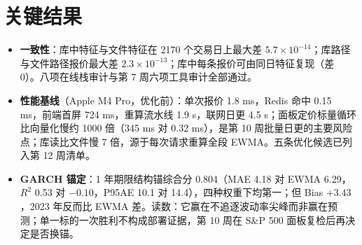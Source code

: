 \documentclass[11pt]{ctexart}
\begin{document}
\section{关键结果}
\begin{itemize}
  \item \textbf{一致性}：库中特征与文件特征在 2170 个交易日上最大差 $5.7\times10^{-14}$；库路径与文件路径报价最大差 $2.3\times10^{-13}$；库中每条报价可由同日特征复现（差 0）。八项在线栈审计与第 7 周六项工具审计全部通过。
  \item \textbf{性能基线}（Apple M4 Pro，优化前）：单次报价 1.8 ms，Redis 命中 0.15 ms，前端首屏 724 ms，重算流水线 1.9 s，联网日更 4.5 s；面板定价标量循环比向量化慢约 1000 倍（345 ms 对 0.32 ms），是第 10 周批量日更的主要风险点；库读比文件慢 7 倍，源于每次请求重算全段 EWMA。五条优化候选已列入第 12 周清单。
  \item \textbf{GARCH 锚定}：1 年期限结构锚综合分 0.804（MAE 4.18 对 EWMA 6.29，$R^2$ 0.53 对 $-0.10$，P95AE 10.1 对 14.4），四种权重下均第一；但 Bias $+3.43$，2023 年反而比 EWMA 差。读数：它赢在不追逐波动率尖峰而非赢在预测；单一标的一次胜利不构成部署证据，第 10 周在 S\&P 500 面板复检后再决定是否换锚。
\end{itemize}
\end{document}
